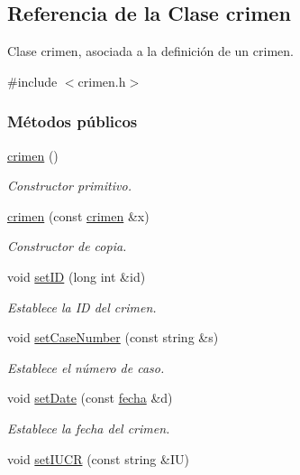 \hypertarget{classcrimen}{\subsection{Referencia de la Clase crimen}
\label{classcrimen}
}


Clase crimen, asociada a la definición de un crimen.  




{\ttfamily \#include $<$crimen.\-h$>$}

\subsubsection*{Métodos públicos}
\begin{DoxyCompactItemize}
\item 
\hyperlink{classcrimen_ab1147e36869c7e635699e4ef746a7555}{crimen} ()
\begin{DoxyCompactList}\small\item\em Constructor primitivo. \end{DoxyCompactList}\item 
\hyperlink{classcrimen_a50b783e821c2f5bc829eceb9048c12d7}{crimen} (const \hyperlink{classcrimen}{crimen} \&x)
\begin{DoxyCompactList}\small\item\em Constructor de copia. \end{DoxyCompactList}\item 
void \hyperlink{classcrimen_a2675734f5049f41b5fb5dbc4778df7f8}{set\-I\-D} (long int \&id)
\begin{DoxyCompactList}\small\item\em Establece la I\-D del crimen. \end{DoxyCompactList}\item 
void \hyperlink{classcrimen_a98ee8c42a0ec09c704c5f17e812a6bd5}{set\-Case\-Number} (const string \&s)
\begin{DoxyCompactList}\small\item\em Establece el número de caso. \end{DoxyCompactList}\item 
void \hyperlink{classcrimen_ac308c139bb8b599a7badbecd91bfbc5a}{set\-Date} (const \hyperlink{classfecha}{fecha} \&d)
\begin{DoxyCompactList}\small\item\em Establece la fecha del crimen. \end{DoxyCompactList}\item 
void \hyperlink{classcrimen_a7acfecba5cda34a7dd659f12c5ed038e}{set\-I\-U\-C\-R} (const string \&I\-U)

\end{DoxyCompactItemize}
